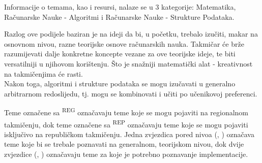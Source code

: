 \hspace{2em}Informacije o temama, kao i resursi, nalaze se u 3 kategorije: Matematika, Računarske Nauke - Algoritmi i Računarske Nauke - Strukture Podataka.

Razlog ove podijele baziran je na ideji da bi, u početku, trebalo izučiti, makar na osnovnom nivou, razne teorijske osnove računarskih nauka. Takmičar će brže razumijevati dalje konkretne koncepte vezane za ove teorijske ideje, te biti versatilniji u njihovom korištenju. Što je snažniji matematički alat - kreativnost na takmičenjima će rasti. \\
Nakon toga, algoritmi i strukture podataka se mogu izučavati u generalno arbitrarnom redoslijedu, tj. mogu se kombinovati i učiti po učenikovoj preferenci.

Teme označene sa \textsuperscript{\textnormal{REG}} označavaju teme koje se mogu pojaviti na regionalnom takmičenju, dok teme označene sa \textsuperscript{\textnormal{REP}} označavaju teme koje se mogu pojaviti isključivo na republičkom takmičenju.
Jedna zvjezdica pored nivoa (\reg, \rep) označava teme koje bi se trebale poznavati na generalnom, teorijskom nivou, dok dvije zvjezdice (\regg, \repp) označavaju teme za koje je potrebno poznavanje implementacije.